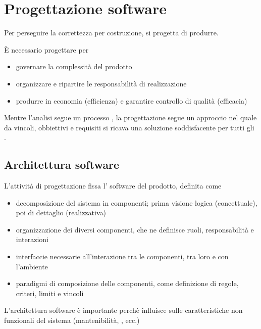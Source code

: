 \section{Progettazione software}

Per perseguire la correttezza per costruzione, si progetta 
di produrre.

È necessario progettare per

\begin{itemize}
  \item governare la complessità del prodotto
  \item organizzare e ripartire le responsabilità di realizzazione
  \item produrre in economia (efficienza) e garantire controllo di qualità
        (efficacia)
\end{itemize}

Mentre l'analisi segue un processo , la progettazione
segue un approccio  nel quale da vincoli, obbiettivi e
requisiti si ricava una soluzione soddisfacente per tutti gli
.


\subsection{Architettura software}

L'attività di progettazione fissa l' software del prodotto,
definita come

\begin{itemize}
  \item decomposizione del sistema in componenti; prima visione logica
        (concettuale), poi di dettaglio (realizzativa)
  \item organizzazione dei diversi componenti, che ne definisce ruoli,
        responsabilità e interazioni
  \item interfaccie necessarie all'interazione tra le componenti, tra loro e con
        l'ambiente
  \item paradigmi di composizione delle componenti, come definizione di regole,
        criteri, limiti e vincoli
\end{itemize}

L'architettura software è importante perchè influisce sulle caratteristiche non
funzionali del sistema (mantenibilità, , ecc.)


